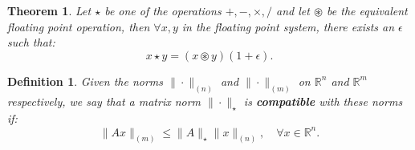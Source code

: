 \documentclass[a4paper, 12pt]{article}
\newtheorem{theorem}{Theorem}[section]
\newtheorem{definition}{Definition}[section]
\newcommand {\R}{\mathbb{R}}
\newcommand {\1}{\textrm{\textbf{1}}}
\begin{document}
\begin{theorem}
Let $\star$ be one of the operations $+, -, \times, /$ and let $\circledast$ be the equivalent floating point operation, then $\forall x, y$ in 
the floating point system, there exists an $\epsilon$ such that:
\[
    x \star y = (x \circledast y)(1 + \epsilon).
\]
\end{theorem}

\setcounter{definition}{11}
\begin{definition}
  Given the norms $\| \cdot \|_{(n)}$ and $\| \cdot \|_{(m)}$ on $\R^n$ and $\R^{m}$ respectively, we say that a matrix norm $\| \cdot \|_{\star}$ is \textbf{compatible} 
  with these norms if:
  \[
      \| A x \|_{(m)} \leq \| A \|_{\star} \| x \|_{(n)}, \quad \forall x \in \R^n.
  \]
\end{definition}

\end{document}
